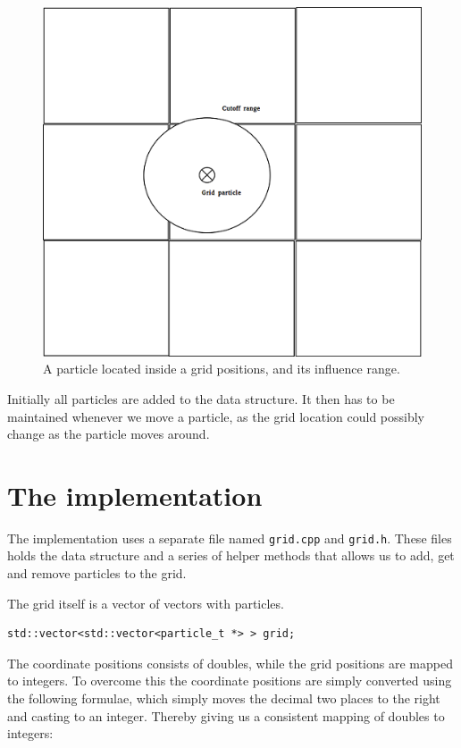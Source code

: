 \documentclass[a4paper,11pt,oneside]{book}
\begin{document}
\begin{figure}[H]
\begin{minipage}[b]{0.4\textwidth}
    \includegraphics[width=\textwidth]{gridexample.png}
    \caption{A particle located inside a grid positions, and its influence range.}
  \end{minipage}
\end{figure}

Initially all particles are added to the data structure. It then has to be maintained whenever we move a particle, as the grid location could possibly change as the particle moves around.

\section{The implementation}
The implementation uses a separate file named \verb!grid.cpp! and \verb!grid.h!. These files holds the data structure and a series of helper methods that allows us to add, get and remove particles to the grid.

The grid itself is 	a vector of vectors with particles.

\begin{verbatim}
std::vector<std::vector<particle_t *> > grid;
\end{verbatim}

The coordinate positions consists of doubles, while the grid positions are mapped to integers. To overcome this the coordinate positions are simply converted using the following formulae, which simply moves the decimal two places to the right and casting to an integer. Thereby giving us a consistent mapping of doubles to integers:
\end{document}
